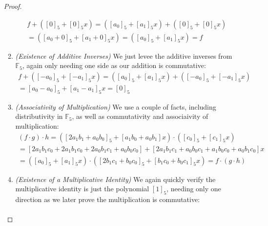 \documentclass[12pt]{article}
\newenvironment{ex}[2][Exercise]{\begin{trivlist}
\item[\hskip \labelsep {\bfseries #1}\hskip \labelsep {\bfseries #2.}]}{\end{trivlist}}
\begin{document}
\begin{ex}{2}
\begin{enumerate}[label=(\alph*)]
\begin{proof}
\begin{enumerate}
                \begin{equation}
                    \begin{aligned}
                        f + ([0]_5 + [0]_5x) = ([a_0]_5 + [a_1]_5x) + ([0]_5 + [0]_5x) \\ =
                        ([a_0 + 0]_5 + [a_1 + 0]_5x) = ([a_0]_5 + [a_1]_5x) = f
                    \end{aligned}
                \end{equation}
                \item \textit{(Existence of Additive Inverses)} We just levee the additive inverses from $\mathbb{F}_5$, again only needing one side as our addition is commutative:
                \begin{equation}
                    \begin{aligned}
                    f + ([-a_0]_5 + [-a_1]_5x) = ([a_0]_5 + [a_1]_5x) + ([-a_0]_5 + [-a_1]_5x) \\
                    = [a_0 - a_0]_5 + [a_1 - a_1]_5x = [0]_5
                    \end{aligned}
                \end{equation}
                \item \textit{(Associativity of Multiplication)} We use a couple of facts, including distributivity in $\mathbb{F}_5$, as well as commutativity and associaivity of multiplication:
                \begin{equation}
                    \begin{aligned}
                        (f \cdot g) \cdot h = ([2a_1b_1 + a_0b_0]_5 + [a_1b_0 + a_0b_1]x) \cdot ([c_0]_5 + [c_1]_5x) \\
                        = [2a_1b_1c_0 + 2a_1b_1c_0 + 2a_0b_1c_1 + a_0b_0c_0] + [2a_1b_1c_1 + a_0b_0c_1 + a_1b_0c_0 + a_0b_1c_0]x \\
                        = ([a_0]_5 + [a_1]_5x) \cdot ([2b_1c_1 + b_0c_0]_5 + [b_1c_0 + b_0c_1]_5x) = f \cdot (g \cdot h)
                    \end{aligned}
                \end{equation}
                \item \textit{(Existence of a Multiplicative Identity)} We again quickly verify the multiplicative identity is just the polynomial $[1]_5$, needing only one direction as we later prove the multiplication is commutative:
                \begin{equation}
                    \begin{aligned}

\end{aligned}
\end{equation}
\end{enumerate}
\end{proof}
\end{enumerate}
\end{ex}
\end{document}
